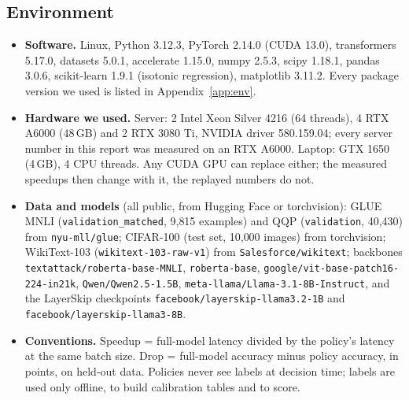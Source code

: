 \subsection{Environment}
\begin{itemize}
  \item \textbf{Software.} Linux, Python 3.12.3, PyTorch 2.14.0 (CUDA 13.0), transformers 5.17.0, datasets 5.0.1,
  accelerate 1.15.0, numpy 2.5.3, scipy 1.18.1, pandas 3.0.6, scikit-learn 1.9.1 (isotonic regression), matplotlib
  3.11.2. Every package version we used is listed in Appendix~\ref{app:env}.
  \item \textbf{Hardware we used.} Server: 2\x{} Intel Xeon Silver 4216 (64 threads), 4\x{} RTX A6000 (48\,GB) and 2\x{} RTX 3080 Ti,
  NVIDIA driver 580.159.04; every server number in this report was measured on an RTX A6000. Laptop: GTX 1650 (4\,GB), 4 CPU threads. Any CUDA GPU can replace either; the measured
  speedups then change with it, the replayed numbers do not.
  \item \textbf{Data and models} (all public, from Hugging Face or torchvision): GLUE MNLI (\nolinkurl{validation_matched},
  9{,}815 examples) and QQP (\nolinkurl{validation}, 40{,}430) from \nolinkurl{nyu-mll/glue}; CIFAR-100 (test set, 10{,}000
  images) from torchvision; WikiText-103 (\nolinkurl{wikitext-103-raw-v1}) from \nolinkurl{Salesforce/wikitext}; backbones
  \nolinkurl{textattack/roberta-base-MNLI}, \nolinkurl{roberta-base}, \nolinkurl{google/vit-base-patch16-224-in21k},
  \nolinkurl{Qwen/Qwen2.5-1.5B}, \nolinkurl{meta-llama/Llama-3.1-8B-Instruct}, and the LayerSkip checkpoints
  \nolinkurl{facebook/layerskip-llama3.2-1B} and \nolinkurl{facebook/layerskip-llama3-8B}.
  \item \textbf{Conventions.} Speedup = full-model latency divided by the policy's latency at the same batch size.
  Drop = full-model accuracy minus policy accuracy, in points, on held-out data. Policies never see labels at decision
  time; labels are used only offline, to build calibration tables and to score.
\end{itemize}

